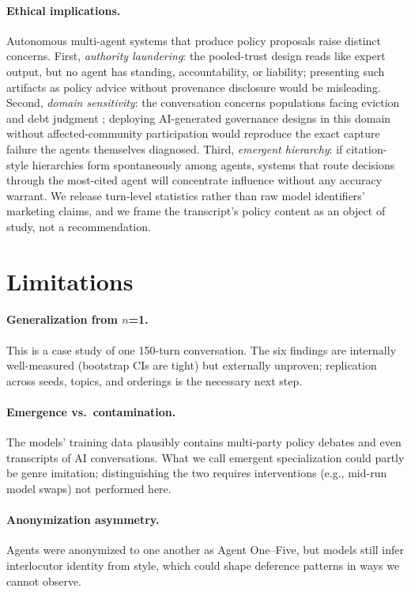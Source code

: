 \documentclass[sigconf,nonacm=true]{acmart}
\begin{document}
\paragraph{Ethical implications.} Autonomous multi-agent systems that produce policy proposals raise distinct concerns. First, \emph{authority laundering}: the pooled-trust design reads like expert output, but no agent has standing, accountability, or liability; presenting such artifacts as policy advice without provenance disclosure would be misleading. Second, \emph{domain sensitivity}: the conversation concerns populations facing eviction and debt judgment \citep{lsc2022justicegap,pew2020debt,nccrc_eviction}; deploying AI-generated governance designs in this domain without affected-community participation would reproduce the exact capture failure the agents themselves diagnosed. Third, \emph{emergent hierarchy}: if citation-style hierarchies form spontaneously among agents, systems that route decisions through the most-cited agent will concentrate influence without any accuracy warrant. We release turn-level statistics rather than raw model identifiers' marketing claims, and we frame the transcript's policy content as an object of study, not a recommendation.

\section{Limitations}
\label{sec:limitations}

\paragraph{Generalization from $n$=1.} This is a case study of one 150-turn conversation. The six findings are internally well-measured (bootstrap CIs are tight) but externally unproven; replication across seeds, topics, and orderings is the necessary next step.

\paragraph{Emergence vs.\ contamination.} The models' training data plausibly contains multi-party policy debates and even transcripts of AI conversations. What we call emergent specialization could partly be genre imitation; distinguishing the two requires interventions (e.g., mid-run model swaps) not performed here.

\paragraph{Anonymization asymmetry.} Agents were anonymized to one another as Agent One--Five, but models still infer interlocutor identity from style, which could shape deference patterns in ways we cannot observe.
\end{document}
